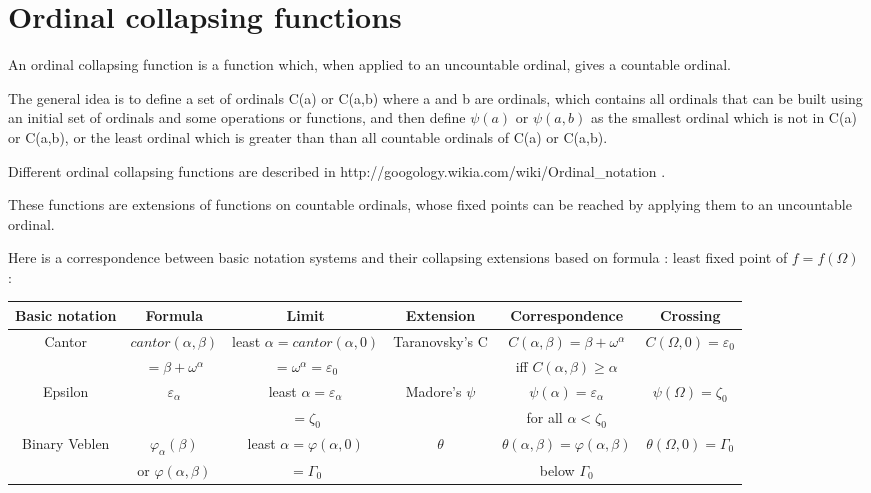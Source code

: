 \documentclass[10pt]{article}
\begin{document}
\section{Ordinal collapsing functions}

An ordinal collapsing function is a function which, when applied to an uncountable ordinal, gives a countable ordinal.

The general idea is to define a set of ordinals C(a) or C(a,b) where a and b are ordinals, which contains all ordinals that can be built using an initial set of ordinals and some operations or functions, and then define \( \psi(a) \) or \( \psi(a,b) \) as the smallest ordinal which is not in C(a) or C(a,b), or the least ordinal which is greater than than all countable ordinals of C(a) or C(a,b).

Different ordinal collapsing functions are described in http://googology.wikia.com/wiki/Ordinal\_notation .

These functions are extensions of functions on countable ordinals, whose fixed points can be reached by applying them to an uncountable ordinal.

Here is a correspondence between basic notation systems and their collapsing extensions based on formula : least fixed point of \( f = f(\Omega) \) :

\bigskip

\begin{tabular}{|c|c|c|c|c|c|} \hline
Basic notation	& Formula			& Limit					& Extension		& Correspondence					& Crossing 				\\ \hline
Cantor		& \( cantor(\alpha,\beta) \)	& least \( \alpha = cantor(\alpha,0) \)	& Taranovsky's C	& \( C(\alpha,\beta) = \beta+\omega^\alpha \)		& \( C(\Omega,0) = \varepsilon_0 \)	\\
		& \( = \beta + \omega^\alpha \)	& \( = \omega^\alpha = \varepsilon_0 \)	&			& iff \( C(\alpha,\beta) \geq \alpha \)			&					\\ \hline
Epsilon		& \( \varepsilon_\alpha	\)	& least \( \alpha = \varepsilon_\alpha\)& Madore's \( \psi \)	& \( \psi(\alpha) = \varepsilon_\alpha \)		& \( \psi(\Omega) = \zeta_0 \)		\\
		&				& \( = \zeta_0 \)			&			& for all \( \alpha < \zeta_0 \)			& 					\\ \hline
Binary Veblen	& \( \varphi_\alpha(\beta) \)	& least \( \alpha = \varphi(\alpha,0) \)& \( \theta \)		& \( \theta(\alpha,\beta) = \varphi(\alpha,\beta) \)	& \( \theta(\Omega,0) = \Gamma_0 \)	\\
		& or \( \varphi(\alpha,\beta) \)& \( = \Gamma_0 \)			&			& below \( \Gamma_0 \)					&					\\ \hline
													
\end{tabular}
\end{document}

